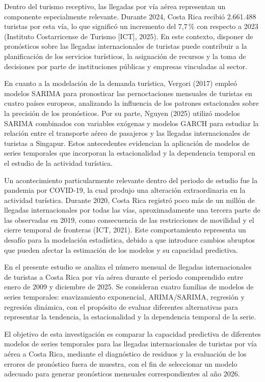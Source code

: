 \documentclass[12pt]{article}
\begin{document}
Dentro del turismo receptivo, las llegadas por vía aérea 
representan un componente especialmente relevante. Durante 
2024, Costa Rica recibió 2.661.488 turistas por esta vía, 
lo que significó un incremento del 7,7\,\% con respecto 
a 2023 (Instituto Costarricense de Turismo [ICT], 2025). 
En este contexto, disponer de pronósticos sobre las 
llegadas internacionales de turistas puede contribuir 
a la planificación de los servicios turísticos, la 
asignación de recursos y la toma de decisiones por parte 
de instituciones públicas y empresas vinculadas al sector.

En cuanto a la modelación de la demanda turística, 
Vergori (2017) empleó modelos SARIMA para pronosticar 
las pernoctaciones mensuales de turistas en cuatro 
países europeos, analizando la influencia de los 
patrones estacionales sobre la precisión de los 
pronósticos. Por su parte, Nguyen (2025) utilizó 
modelos SARIMA combinados con variables exógenas y 
modelos GARCH para estudiar la relación entre el 
transporte aéreo de pasajeros y las llegadas 
internacionales de turistas a Singapur. Estos 
antecedentes evidencian la aplicación de modelos 
de series temporales que incorporan la estacionalidad 
y la dependencia temporal en el estudio de la 
actividad turística.

Un acontecimiento particularmente relevante dentro del 
periodo de estudio fue la pandemia por COVID-19, la cual 
produjo una alteración extraordinaria en la actividad 
turística. Durante 2020, Costa Rica registró poco más de 
un millón de llegadas internacionales por todas las vías, 
aproximadamente una tercera parte de las observadas en 
2019, como consecuencia de las restricciones de movilidad 
y el cierre temporal de fronteras (ICT, 2021). Este 
comportamiento representa un desafío para la modelación 
estadística, debido a que introduce cambios abruptos 
que pueden afectar la estimación de los modelos y su 
capacidad predictiva.

En el presente estudio se analiza el número mensual de 
llegadas internacionales de turistas a Costa Rica por 
vía aérea durante el periodo comprendido entre enero de 
2009 y diciembre de 2025. Se consideran cuatro familias 
de modelos de series temporales: suavizamiento exponencial, 
ARIMA/SARIMA, regresión y regresión dinámica, con el 
propósito de evaluar diferentes alternativas para 
representar la tendencia, la estacionalidad y la 
dependencia temporal de la serie.

El objetivo de esta investigación es comparar la capacidad 
predictiva de diferentes modelos de series temporales 
para las llegadas internacionales de turistas por vía 
aérea a Costa Rica, mediante el diagnóstico de residuos 
y la evaluación de los errores de pronóstico fuera de 
muestra, con el fin de seleccionar un modelo adecuado 
para generar pronósticos mensuales correspondientes 
al año 2026.
\end{document}
